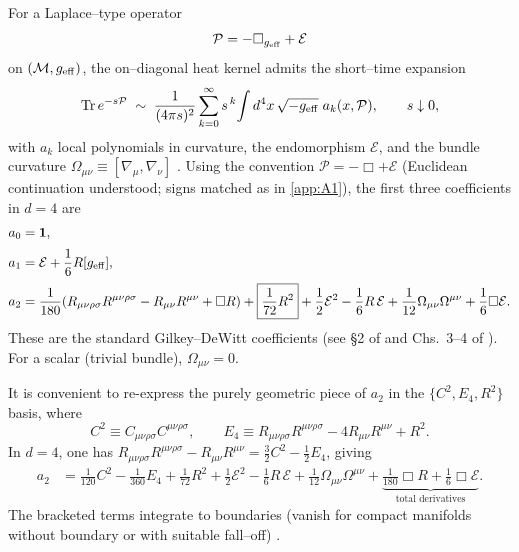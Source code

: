 \documentclass{iopjournal}
\begin{document}
For a Laplace–type operator
\[
\mathcal{P}=-\Box_{g_{\rm eff}}+\mathcal{E}
\]
on $(\mathcal{M},g_{\rm eff})$, the on–diagonal heat kernel admits the short–time expansion
\[
\mathrm{Tr}\,e^{-s\mathcal{P}}
\;\sim\;
\frac{1}{(4\pi s)^{2}}\sum_{k=0}^\infty s^{\,k}\!\int d^4x\,\sqrt{-g_{\rm eff}}\;a_k(x,\mathcal{P}),
\qquad s\downarrow0,
\]
with $a_k$ local polynomials in curvature, the endomorphism $\mathcal{E}$, and the bundle curvature
$\Omega_{\mu\nu}\equiv[\nabla_\mu,\nabla_\nu]$ \cite{DeWitt1965,ParkerToms,Vassilevich2003,Avramidi2000}.
Using the convention $\mathcal{P}=-\Box+\mathcal{E}$ (Euclidean continuation understood; signs matched as in \cref{app:A1}), the first three coefficients in $d=4$ are
\begin{align}
a_0 &= \mathbf{1}, \label{eq:a0}\\[2pt]
a_1 &= \mathcal{E}+\frac{1}{6}R[g_{\rm eff}], \label{eq:a1}\\[2pt]
a_2 &= \frac{1}{180}\!\left(R_{\mu\nu\rho\sigma}R^{\mu\nu\rho\sigma}-R_{\mu\nu}R^{\mu\nu}+\Box R\right)
      +\boxed{\frac{1}{72}R^2}
      +\frac{1}{2}\mathcal{E}^2-\frac{1}{6}R\,\mathcal{E}
      +\frac{1}{12}\Omega_{\mu\nu}\Omega^{\mu\nu}
      +\frac{1}{6}\Box \mathcal{E}.
\label{eq:a2_general}
\end{align}
These are the standard Gilkey–DeWitt coefficients (see \S2 of \cite{Vassilevich2003} and Chs.~3–4 of \cite{ParkerToms,Avramidi2000}). For a scalar (trivial bundle), $\Omega_{\mu\nu}=0$.

It is convenient to re-express the purely geometric piece of $a_2$ in the $\{C^2,E_4,R^2\}$ basis, where
\[
C^2\equiv C_{\mu\nu\rho\sigma}C^{\mu\nu\rho\sigma},\qquad
E_4\equiv R_{\mu\nu\rho\sigma}R^{\mu\nu\rho\sigma}-4R_{\mu\nu}R^{\mu\nu}+R^2 .
\]
In $d=4$, one has $R_{\mu\nu\rho\sigma}R^{\mu\nu\rho\sigma}-R_{\mu\nu}R^{\mu\nu}
=\tfrac{3}{2}C^2-\tfrac{1}{2}E_4$, giving
\begin{align}
a_2 &= \frac{1}{120}C^2-\frac{1}{360}E_4
      +\boxed{\frac{1}{72}R^2}
      +\frac{1}{2}\mathcal{E}^2-\frac{1}{6}R\,\mathcal{E}
      +\frac{1}{12}\Omega_{\mu\nu}\Omega^{\mu\nu}
      +\underbrace{\frac{1}{180}\Box R+\frac{1}{6}\Box \mathcal{E}}_{\text{total derivatives}}.
\label{eq:a2_CE}
\end{align}
The bracketed terms integrate to boundaries (vanish for compact manifolds without boundary or with suitable fall–off) \cite{ParkerToms,Vassilevich2003}.
\end{document}
